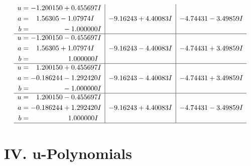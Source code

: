 \documentclass[1p]{elsarticle_modified}
\theoremstyle{definition}
\begin{document}
$$\begin{array}{c|c|c}
\begin{aligned}
u &= -1.200150 + 0.455697 I \\
a &= \phantom{-}1.56305 - 1.07974 I \\
b &= \phantom{-0.000000 } -1.000000 I\end{aligned}
 & -9.16243 + 4.40083 I & -4.74431 - 3.49859 I \\ \hline\begin{aligned}
u &= -1.200150 - 0.455697 I \\
a &= \phantom{-}1.56305 + 1.07974 I \\
b &= \phantom{-0.000000 -}1.000000 I\end{aligned}
 & -9.16243 - 4.40083 I & -4.74431 + 3.49859 I \\ \hline\begin{aligned}
u &= \phantom{-}1.200150 + 0.455697 I \\
a &= -0.186244 - 1.292420 I \\
b &= \phantom{-0.000000 } -1.000000 I\end{aligned}
 & -9.16243 - 4.40083 I & -4.74431 + 3.49859 I \\ \hline\begin{aligned}
u &= \phantom{-}1.200150 - 0.455697 I \\
a &= -0.186244 + 1.292420 I \\
b &= \phantom{-0.000000 -}1.000000 I\end{aligned}
 & -9.16243 + 4.40083 I & -4.74431 - 3.49859 I\\
 \hline 
 \end{array}$$\newpage
\newpage\renewcommand{\arraystretch}{1}
\centering \section*{ IV. u-Polynomials}
\end{document}
